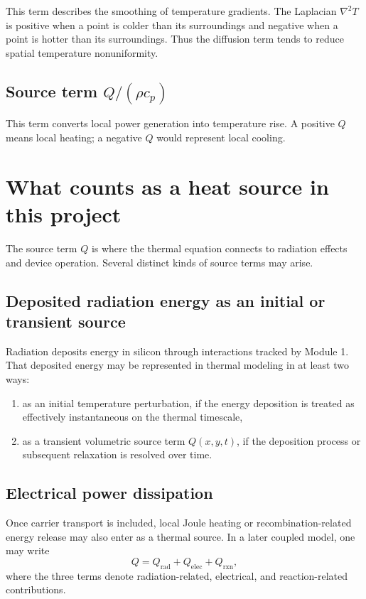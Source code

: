 \documentclass[11pt]{article}
\begin{document}
This term describes the smoothing of temperature gradients. The Laplacian $\nabla^2 T$ is positive when a point is colder than its surroundings and negative when a point is hotter than its surroundings. Thus the diffusion term tends to reduce spatial temperature nonuniformity.

\subsection{Source term $Q/(\rho c_p)$}

This term converts local power generation into temperature rise. A positive $Q$ means local heating; a negative $Q$ would represent local cooling.

\section{What counts as a heat source in this project}

The source term $Q$ is where the thermal equation connects to radiation effects and device operation. Several distinct kinds of source terms may arise.

\subsection{Deposited radiation energy as an initial or transient source}

Radiation deposits energy in silicon through interactions tracked by Module 1. That deposited energy may be represented in thermal modeling in at least two ways:
\begin{enumerate}[label=\arabic*.]
    \item as an initial temperature perturbation, if the energy deposition is treated as effectively instantaneous on the thermal timescale,
    \item as a transient volumetric source term $Q(x,y,t)$, if the deposition process or subsequent relaxation is resolved over time.
\end{enumerate}

\subsection{Electrical power dissipation}

Once carrier transport is included, local Joule heating or recombination-related energy release may also enter as a thermal source. In a later coupled model, one may write
\begin{equation}
Q = Q_{\mathrm{rad}} + Q_{\mathrm{elec}} + Q_{\mathrm{rxn}},
\end{equation}
where the three terms denote radiation-related, electrical, and reaction-related contributions.
\end{document}
